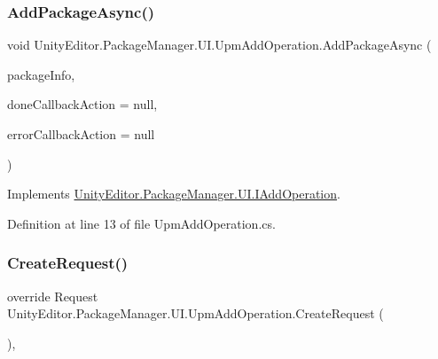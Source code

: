 \subsubsection{\texorpdfstring{AddPackageAsync()}{AddPackageAsync()}}
{\footnotesize\ttfamily void Unity\+Editor.\+Package\+Manager.\+U\+I.\+Upm\+Add\+Operation.\+Add\+Package\+Async (\begin{DoxyParamCaption}\item[{\mbox{\hyperlink{class_unity_editor_1_1_package_manager_1_1_u_i_1_1_package_info}{Package\+Info}}}]{package\+Info,  }\item[{Action$<$ \mbox{\hyperlink{class_unity_editor_1_1_package_manager_1_1_u_i_1_1_package_info}{Package\+Info}} $>$}]{done\+Callback\+Action = {\ttfamily null},  }\item[{Action$<$ \mbox{\hyperlink{class_unity_editor_1_1_package_manager_1_1_u_i_1_1_upm_base_operation_a116dcc466d587905084e826b47f7e05b}{Error}} $>$}]{error\+Callback\+Action = {\ttfamily null} }\end{DoxyParamCaption})}



Implements \mbox{\hyperlink{interface_unity_editor_1_1_package_manager_1_1_u_i_1_1_i_add_operation_aa242e0ad5710496afa857315b7f82e2c}{Unity\+Editor.\+Package\+Manager.\+U\+I.\+I\+Add\+Operation}}.



Definition at line 13 of file Upm\+Add\+Operation.\+cs.

\mbox{\label{class_unity_editor_1_1_package_manager_1_1_u_i_1_1_upm_add_operation_a5b4cbf090d82606a14caf9fd90ccd0c0}} 
\subsubsection{\texorpdfstring{CreateRequest()}{CreateRequest()}}
{\footnotesize\ttfamily override Request Unity\+Editor.\+Package\+Manager.\+U\+I.\+Upm\+Add\+Operation.\+Create\+Request (\begin{DoxyParamCaption}{ }\end{DoxyParamCaption})\hspace{0.3cm}{\ttfamily [protected]}, {\ttfamily [virtual]}}



